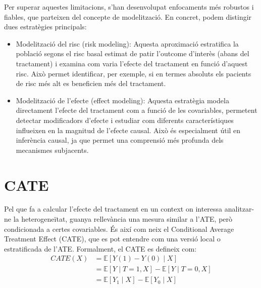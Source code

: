 \documentclass[../main.tex]{subfiles}
\begin{document}
    Per superar aquestes limitacions, s’han desenvolupat enfocaments més robustos i fiables, que parteixen del concepte de modelització. En concret, podem distingir dues estratègies principals:
    \begin{itemize}
        \item Modelització del risc (risk modeling): Aquesta aproximació estratifica la població segons el risc basal estimat de patir l’outcome d’interès (abans del tractament) i examina com varia l’efecte del tractament en funció d’aquest risc. Això permet identificar, per exemple, si en termes absoluts els pacients de risc més alt es beneficien més del tractament.
        \item Modelització de l’efecte (effect modeling): Aquesta estratègia modela directament l’efecte del tractament com a funció de les covariables, permetent detectar modificadors d’efecte i estudiar com diferents característiques influeixen en la magnitud de l’efecte causal. Això és especialment útil en inferència causal, ja que permet una comprensió més profunda dels mecanismes subjacents.
    \end{itemize}
    
    
    \section{CATE} \label{sec:CATE}
    Pel que fa a calcular l’efecte del tractament en un context on interessa analitzar-ne la heterogeneïtat, guanya rellevància una mesura similar a l’ATE, però condicionada a certes covariables. És així com neix el Conditional Average Treatment Effect (CATE), que es pot entendre com una versió local o estratificada de l’ATE. Formalment, el CATE es defineix com:
    \begin{equation}
        \begin{split}
            CATE(X) &= \mathbb{E}[Y(1) - Y(0) \mid X] \\
            &= \mathbb{E}[Y \mid T = 1, X] - \mathbb{E}[Y \mid T = 0, X] \\
            &= \mathbb{E}[Y_1 \mid X] - \mathbb{E}[Y_0 \mid X]
        \end{split}
    \end{equation}
\end{document}
